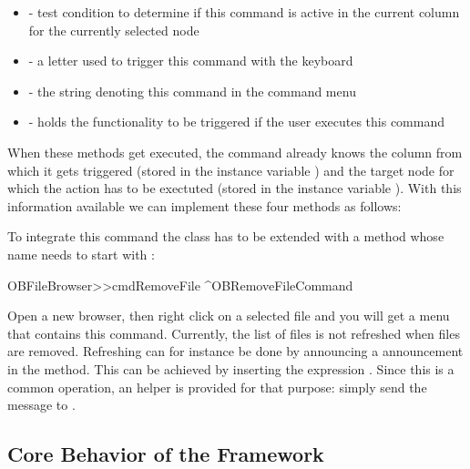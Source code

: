 \documentclass[a4paper,10pt,twoside]{book}
\begin{document}
\begin{itemize}
\item {} - test condition to determine if this command is active in the current column for the currently selected node 
\item {} - a letter used to trigger this command with the keyboard
\item {} - the string denoting this command in the command menu
\item {} - holds the functionality to be triggered if the user executes this command
\end{itemize}

When these methods get executed, the command already knows the column from which it gets triggered (stored in the instance variable ) and the target node for which the action has to be exectuted (stored in the instance variable ). With this information available we can implement these four methods as follows:


To integrate this command the class  has to be extended with a method whose name needs to start with :

\begin{code}{}
OBFileBrowser>>cmdRemoveFile
	^OBRemoveFileCommand
\end{code}

Open a new browser, then right click on a selected file and you will get a menu that contains this command. Currently, the list of files is not refreshed when files are removed. Refreshing can for instance be done by announcing a  announcement in the  method. This can be achieved by inserting the expression . Since this is a common operation, an helper is provided for that purpose: simply send the  message to .

\subsection{Core Behavior of the Framework}\label{sec:corebehavior}
\end{document}

